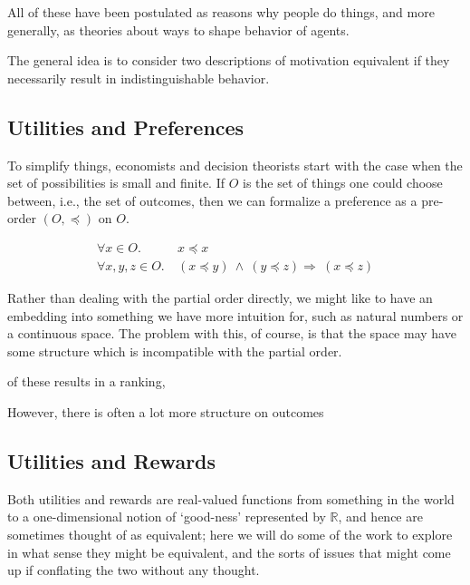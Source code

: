 \documentclass{book}
\begin{document}
	
	
	All of these have been postulated as reasons why people do things, and more generally, as theories about ways to shape behavior of agents. 
	
	
	
	The general idea is to consider two descriptions of motivation equivalent if they necessarily result in indistinguishable behavior. 
	
	
	\subsection{Utilities and Preferences}
	
	To simplify things, economists and decision theorists start with the case when the set of possibilities is small and finite. If $O$ is the set of things one could choose between, i.e., the set of outcomes, then we can formalize a preference as a pre-order $(O, \preccurlyeq)$ on $O$.
	
	\begin{align*}
		\forall x \in O.&~x \preccurlyeq x \tag{Reflexivity}\\
		\forall x,y,z \in O.&~(x\preccurlyeq y)~\land~( y \preccurlyeq z) \Rightarrow~(x \preccurlyeq z) \tag{Transitivity}
	\end{align*}
	
	Rather than dealing with the partial order directly, we might like to have an embedding into something we have more intuition for, such as natural numbers or a continuous space. The problem with this, of course, is that the space may have some structure which is incompatible with the partial order. 
	
	of these results in a ranking, 
	
	However, there is often a lot more structure on outcomes
	
	
	

	
	\subsection{Utilities and Rewards}
	
	Both utilities and rewards are real-valued functions from something in the world to a one-dimensional notion of `good-ness' represented by $\mathbb R$, and hence are sometimes thought of as equivalent; here we will do some of the work to explore in what sense they might be equivalent, and the sorts of issues that might come up if conflating the two without any thought.
	
\end{document}
